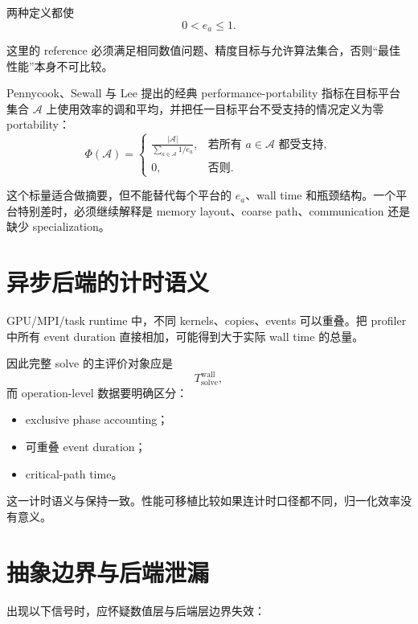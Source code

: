 两种定义都使
\begin{equation}
0<e_a\le1.
\end{equation}

这里的 reference 必须满足相同数值问题、精度目标与允许算法集合，否则“最佳性能”本身不可比较。

Pennycook、Sewall 与 Lee 提出的经典 performance-portability 指标在目标平台集合 $\mathcal A$ 上使用效率的调和平均，并把任一目标平台不受支持的情况定义为零 portability\cite{pennycook2019performance}：
\begin{equation}
\Phi(\mathcal A)
=
\begin{cases}
\displaystyle
\frac{|\mathcal A|}
{\sum_{a\in\mathcal A}1/e_a},
&
\text{若所有 }a\in\mathcal A\text{ 都受支持},
\\[1.0em]
0,
&
\text{否则}.
\end{cases}
\label{eq:portability-pennycook-metric}
\end{equation}

这个标量适合做摘要，但不能替代每个平台的 $e_a$、wall time 和瓶颈结构。一个平台特别差时，必须继续解释是 memory layout、coarse path、communication 还是缺少 specialization。

\section{异步后端的计时语义}

GPU/MPI/task runtime 中，不同 kernels、copies、events 可以重叠。把 profiler 中所有 event duration 直接相加，可能得到大于实际 wall time 的总量。

因此完整 solve 的主评价对象应是
\begin{equation}
T_{\mathrm{solve}}^{\mathrm{wall}},
\end{equation}
而 operation-level 数据要明确区分：
\begin{itemize}
\item exclusive phase accounting；
\item 可重叠 event duration；
\item critical-path time。
\end{itemize}

这一计时语义与保持一致。性能可移植比较如果连计时口径都不同，归一化效率没有意义。

\section{抽象边界与后端泄漏}

出现以下信号时，应怀疑数值层与后端层边界失效：

